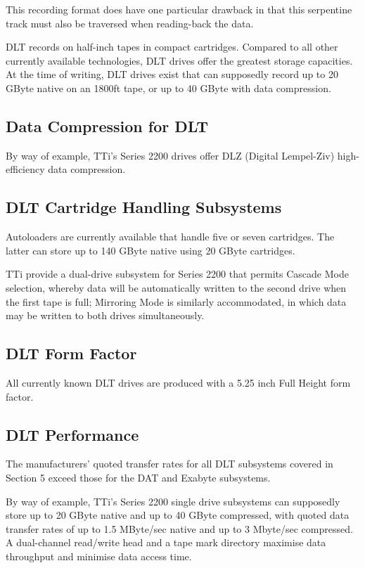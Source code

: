 This recording format does have one particular drawback in that this
serpentine track must also be traversed when reading-back the data.

DLT records on half-inch tapes in compact cartridges. Compared to all other
currently available technologies, DLT drives offer the greatest storage
capacities. At the time of writing, DLT drives exist that can supposedly
record up to 20 GByte native on an 1800ft tape, or up to 40 GByte with data
compression.

\subsection {Data Compression for DLT}

By way of example, TTi's Series 2200 drives offer DLZ (Digital Lempel-Ziv)
high-efficiency data compression.

\subsection {DLT Cartridge Handling Subsystems}

Autoloaders are currently available that handle five or seven cartridges.
The latter can store up to 140 GByte native using 20 GByte cartridges.

TTi provide a dual-drive subsystem for Series 2200 that permits Cascade Mode
selection, whereby data will be automatically written to the second drive
when the first tape is full; Mirroring Mode is similarly accommodated, in
which data may be written to both drives simultaneously.

\subsection {DLT Form Factor}

All currently known DLT drives are produced with a 5.25 inch Full Height
form factor.

\subsection {DLT Performance}

The manufacturers' quoted transfer rates for all DLT subsystems covered in
Section 5 exceed those for the DAT and Exabyte subsystems.

By way of example, TTi's Series 2200 single drive subsystems can supposedly
store up to 20 GByte native and up to 40 GByte compressed, with quoted data
transfer rates of up to 1.5 MByte/sec native and up to 3 Mbyte/sec
compressed. A dual-channel read/write head and a tape mark directory
maximise data throughput and minimise data access time.

